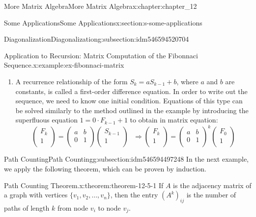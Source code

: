 \documentclass[oneside,10pt,]{book}
\numberwithin{equation}{section}
\begin{document}
\begin{chapterptx}{More Matrix Algebra}{}{More Matrix Algebra}{}{}{x:chapter:chapter_12}
\begin{sectionptx}{Some Applications}{}{Some Applications}{}{}{x:section:s-some-applications}
\begin{subsectionptx}{Diagonalization}{}{Diagonalization}{}{}{g:subsection:idm546594520704}
\begin{example}{Application to Recursion: Matrix Computation of the Fibonnaci Sequence.}{x:example:ex-fibonnaci-matrix}
\begin{enumerate}[label=(\arabic*)]
\item{}A recurrence relationship of the form \(S_k = a S_{k-1} + b\), where \(a\) and \(b\) are constants, is called a first-order difference equation. In order to write out the sequence, we need to know one initial condition.  Equations of this type can be solved similarly to the method outlined in the example by introducing the superfluous equation \(1 =0\cdot F_{k-1}+1\) to obtain in matrix equation:%
\begin{equation*}
\left(
\begin{array}{c}
F_k \\
1 \\
\end{array}
\right)=\left(
\begin{array}{cc}
a & b \\
0 & 1 \\
\end{array}
\right)\left(
\begin{array}{c}
S_{k-1} \\
1 \\
\end{array}
\right)\textrm{     }\Rightarrow \left(
\begin{array}{c}
F_k \\
1 \\
\end{array}
\right)=\left(
\begin{array}{cc}
a & b \\
0 & 1 \\
\end{array}
\right)^k\left(
\begin{array}{c}
F_0 \\
1 \\
\end{array}
\right)
\end{equation*}
%
\end{enumerate}
%
\end{example}
\end{subsectionptx}
%
%
\typeout{************************************************}
\typeout{************************************************}
%
\begin{subsectionptx}{Path Counting}{}{Path Counting}{}{}{g:subsection:idm546594497248}
In the next example, we apply the following theorem, which can be proven by induction.%
\begin{theorem}{Path Counting Theorem.}{}{x:theorem:theorem-12-5-1}%
If \(A\) is the adjacency matrix of a graph with vertices \(\{v_1, v_2, \dots,v_n\}\), then the entry \(\left(A^k\right)_{ij}\)  is the number of paths of length \(k\) from node \(v_i\) to node \(v_j\).%

\end{theorem}
\end{subsectionptx}
\end{sectionptx}
\end{chapterptx}
\end{document}

